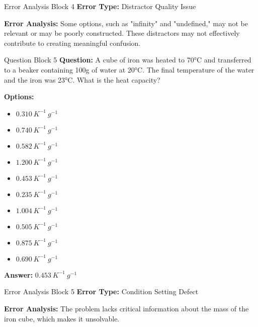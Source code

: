 \begin{errorbox}{Error Analysis Block 4}
\noindent \textbf{Error Type:} Distractor Quality Issue

\noindent \textbf{Error Analysis:} Some options, such as "infinity" and "undefined," may not be relevant or may be poorly constructed. These distractors may not effectively contribute to creating meaningful confusion.
\end{errorbox}

\begin{questionbox}{Question Block 5}
\noindent \textbf{Question:} A cube of iron was heated to 70°C and transferred to a beaker containing 100g of water at 20°C. The final temperature of the water and the iron was 23°C. What is the heat capacity?

\bigskip
\noindent \textbf{Options:}
\begin{itemize}
    \item $0.310 \ K^{-1} \ g^{-1}$
    \item $0.740 \ K^{-1} \ g^{-1}$
    \item $0.582 \ K^{-1} \ g^{-1}$
    \item $1.200 \ K^{-1} \ g^{-1}$
    \item $0.453 \ K^{-1} \ g^{-1}$
    \item $0.235 \ K^{-1} \ g^{-1}$
    \item $1.004 \ K^{-1} \ g^{-1}$
    \item $0.505 \ K^{-1} \ g^{-1}$
    \item $0.875 \ K^{-1} \ g^{-1}$
    \item $0.690 \ K^{-1} \ g^{-1}$
\end{itemize}

\noindent \textbf{Answer:} $0.453 \ K^{-1} \ g^{-1}$
\end{questionbox}

\begin{errorbox}{Error Analysis Block 5}
\noindent \textbf{Error Type:} Condition Setting Defect

\noindent \textbf{Error Analysis:} The problem lacks critical information about the mass of the iron cube, which makes it unsolvable.
\end{errorbox}


